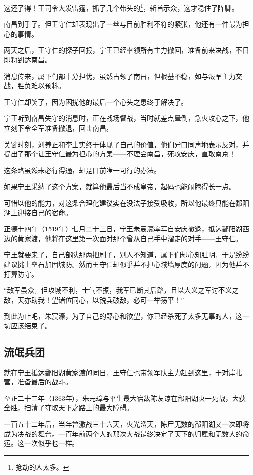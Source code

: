 \begin{multicols}{\theparacolNo}
这还了得！王司令大发雷霆，抓了几个带头的\footnote{抢劫的人太多。}，斩首示众，这才稳住了阵脚。

南昌到手了。但王守仁却表现出了一丝与目前胜利不符的紧张，他还有一件最为担心的事情。

两天之后，王守仁的探子回报，宁王已经率领所有主力撤回，准备前来决战，不日即将到达南昌。

消息传来，属下们都十分担忧，虽然占领了南昌，但根基不稳，如与叛军主力交战，胜负难以预料。

王守仁却笑了，因为困扰他的最后一个心头之患终于解决了。

宁王听到南昌失守的消息时，正在战场督战，当时就差点晕倒，急火攻心之下，他立刻下令全军准备撤退，回击南昌。

关键时刻，刘养正和李士实终于体现了自己的价值，他们异口同声地表示反对，并提出了那个让王守仁最为担心的方案——不理会南昌，死攻安庆，直取南京！

这条路虽然未必行得通，却是目前唯一可行的办法。

如果宁王采纳了这个方案，就算他最后当不成皇帝，起码也能闹腾得长一点。

可惜以他的能力，对这条合理化建议实在没法子接受吸收，所以他最终只能在鄱阳湖上迎接自己的宿命。

正德十四年（1519年）七月二十三日，宁王朱宸濠率军自安庆撤退，抵达鄱阳湖西边的黄家渡，他将在这里第一次面对那个曾从自己手中溜走的对手——王守仁。

宁王就要来了，自己部队那两把刷子，别人不知道，属下们却心知肚明，于是纷纷建议挑土垒石加固城防。然而王守仁却似乎并不担心城墙厚度的问题，因为他并不打算防守。

“敌军虽众，但攻城不利，士气不振，我军已断其后路，且以大义之军讨不义之敌，天亦助我！望诸位同心，以锐兵破敌，必可一举荡平！”

到此为止吧，朱宸濠，为了自己的野心和欲望，你已经杀死了太多无辜的人，这一切应该结束了。

\subsection{流氓兵团}
就在宁王抵达鄱阳湖黄家渡的同日，王守仁也带领军队主力赶到这里，于对岸扎营，准备最后的战斗。

至正二十三年（1363年），朱元璋与平生最大宿敌陈友谅在鄱阳湖决一死战，大获全胜，扫清了夺取天下之路上的最大障碍。

一百五十二年后，当年曾激战三十六天，火光滔天，陈尸无数的鄱阳湖又一次即将成为决战的舞台。一百年前两个人的那次大战最终决定了天下的归属和无数人的命运。这一次似乎也一样。


\end{multicols}

